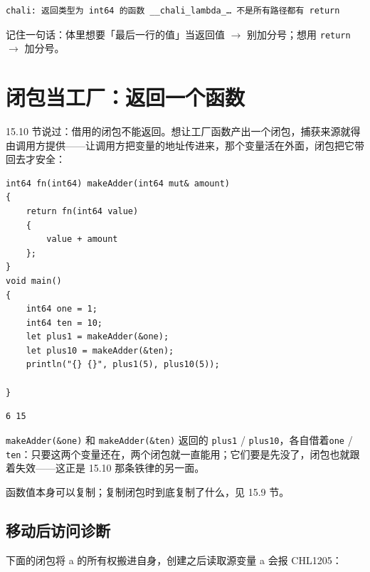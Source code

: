 \par
\medskip
\begin{lstlisting}[style=out]
chali: 返回类型为 int64 的函数 __chali_lambda_… 不是所有路径都有 return
\end{lstlisting}
\par
\medskip

记住一句话：体里想要「最后一行的值」当返回值 \ensuremath{\rightarrow} 别加分号；想用 \texttt{return} \ensuremath{\rightarrow} 加分号。

\section{闭包当工厂：返回一个函数}

15.10 节说过：借用的闭包不能返回。想让工厂函数产出一个闭包，捕获来源就得由调用方提供——让调用方把变量的地址传进来，那个变量活在外面，闭包把它带回去才安全：

\par
\medskip
\begin{lstlisting}[style=chali]
int64 fn(int64) makeAdder(int64 mut& amount)
{
    return fn(int64 value)
    {
        value + amount
    };
}
void main()
{
    int64 one = 1;
    int64 ten = 10;
    let plus1 = makeAdder(&one);
    let plus10 = makeAdder(&ten);
    println("{} {}", plus1(5), plus10(5));

}
\end{lstlisting}
\par
\medskip

\par
\medskip
\begin{lstlisting}[style=out]
6 15
\end{lstlisting}
\par
\medskip

\texttt{make\allowbreak{}Adder(\allowbreak{}\&one)\allowbreak{}} 和 \texttt{make\allowbreak{}Adder(\allowbreak{}\&ten)\allowbreak{}} 返回的 \texttt{plus1} / \texttt{plus10}，各自借着\texttt{one} / \texttt{ten}：只要这两个变量还在，两个闭包就一直能用；它们要是先没了，闭包也就跟着失效——这正是 15.10 那条铁律的另一面。

函数值本身可以复制；复制闭包时到底复制了什么，见 15.9 节。

\subsection*{移动后访问诊断}

下面的闭包将 a 的所有权搬进自身，创建之后读取源变量 a 会报 CHL1205：

